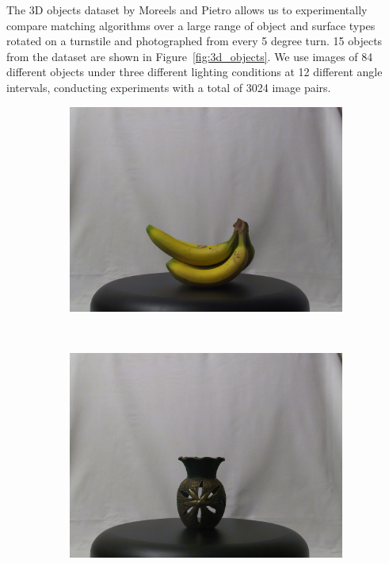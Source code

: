\documentclass[review]{elsarticle}
\begin{document}
The 3D objects dataset by Moreels and Pietro \cite{moreels2007evaluation} allows us to experimentally compare matching algorithms over a large range of object and surface types rotated on a turnstile and photographed from every 5 degree turn.  15 objects from the dataset are shown in Figure~\ref{fig:3d_objects}.  We use images of 84 different objects under three different lighting conditions at 12 different angle intervals, conducting experiments with a total of 3024 image pairs.  

\begin{figure}[htb]
    \centering
    \begin{subfigure}[t]{0.15\columnwidth}
        \centering
        \includegraphics[width=1\columnwidth]{images/3d/1}
    \end{subfigure}%
    ~ %
    \begin{subfigure}[t]{0.15\columnwidth}
        \centering
        \includegraphics[width=1\columnwidth]{images/3d/2}

\end{subfigure}
\end{figure}
\end{document}
